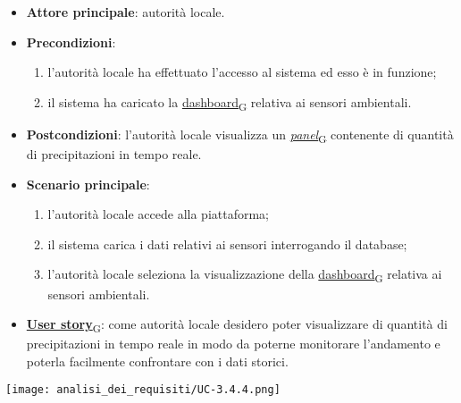 \newpage
{}
\begin{itemize}
	\item \textbf{Attore principale}: autorità locale.
	\item \textbf{Precondizioni}:
	      \begin{enumerate}
		      \item l'autorità locale ha effettuato l'accesso al sistema ed esso è in funzione;
		      \item il sistema ha caricato la \href{https://7last.github.io/docs/pb/documentazione-interna/glossario\#dashboard}{dashboard\textsubscript{G}} relativa ai sensori ambientali.
	      \end{enumerate}
	\item \textbf{Postcondizioni}: l'autorità locale visualizza un \href{https://7last.github.io/docs/pb/documentazione-interna/glossario\#panel}{\textit{panel}\textsubscript{G}} contenente di quantità di precipitazioni in tempo reale.
	\item \textbf{Scenario principale}:
	      \begin{enumerate}
		      \item l'autorità locale accede alla piattaforma;
		      \item il sistema carica i dati relativi ai sensori interrogando il database;
		      \item l'autorità locale seleziona la visualizzazione della \href{https://7last.github.io/docs/pb/documentazione-interna/glossario\#dashboard}{dashboard\textsubscript{G}} relativa ai sensori ambientali.
	      \end{enumerate}
	\item \href{https://7last.github.io/docs/pb/documentazione-interna/glossario\#user-story}{\textbf{User story}\textsubscript{G}}:
	      come autorità locale desidero poter visualizzare di quantità di precipitazioni in tempo reale in modo da poterne monitorare l'andamento
	      e poterla facilmente confrontare con i dati storici.
\end{itemize}
\begin{center}
	\texttt{[image: analisi\_dei\_requisiti/UC-3.4.4.png]}
\end{center}

